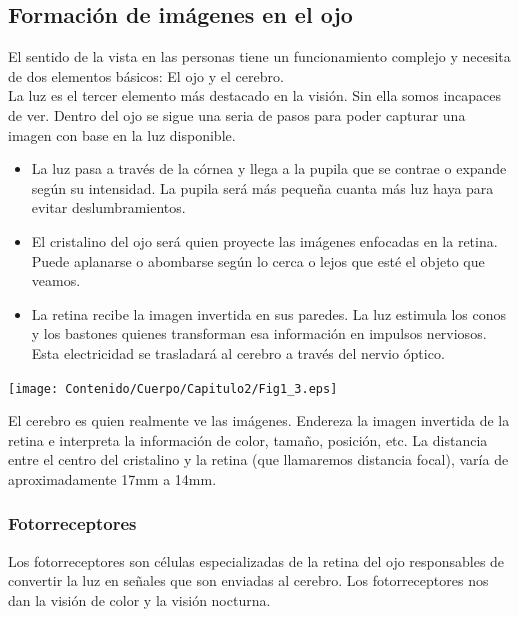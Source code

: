 \subsection{Formación de imágenes en el ojo}
El sentido de la vista en las personas tiene un funcionamiento complejo y
necesita de dos elementos básicos: El ojo y el cerebro.\\
La luz es el tercer elemento más destacado en la visión. Sin ella somos
incapaces de ver. Dentro del ojo se sigue una seria de pasos para poder capturar
una imagen con base en la luz disponible.
\begin{itemize}
	\item La luz pasa a través de la córnea y llega a la pupila que se contrae o
	      expande según su intensidad. La pupila será más pequeña cuanta más luz haya para
	      evitar deslumbramientos.
	\item El cristalino del ojo será quien proyecte las imágenes enfocadas en la retina.
	      Puede aplanarse o abombarse según lo cerca o lejos que esté el objeto que veamos.
	\item La retina recibe la imagen invertida en sus paredes. La luz estimula los
	      conos y los bastones quienes transforman esa información en impulsos nerviosos.
	      Esta electricidad se trasladará al cerebro a través del nervio óptico.
\end{itemize}
\begin{center}
	\texttt{[image: Contenido/Cuerpo/Capitulo2/Fig1\_3.eps]}
	\label{fig:MarcoTeorico:Fig3}
\end{center}
El cerebro es quien realmente ve las imágenes. Endereza la imagen invertida de la
retina e interpreta la información de color, tamaño, posición, etc.
La distancia entre el centro del
cristalino y la retina (que llamaremos distancia focal), varía de
aproximadamente 17mm a 14mm.\cite{Book:Jose2005}

\subsubsection{Fotorreceptores}
Los fotorreceptores son células especializadas de la retina del ojo responsables de
convertir la luz en señales que son enviadas al cerebro. Los fotorreceptores nos dan
la visión de color y la visión nocturna.\cite{WEB:American}

